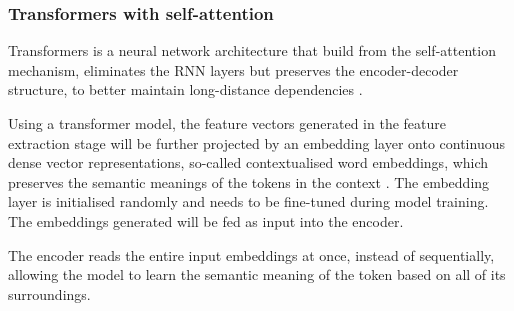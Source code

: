 \subsubsection{Transformers with self-attention}
Transformers is a neural network architecture that build from the self-attention mechanism, eliminates the RNN layers but preserves the encoder-decoder structure, to better maintain long-distance dependencies \cite{Kalyan21transformer}. 

Using a transformer model, the feature vectors generated in the feature extraction stage will be further projected by an embedding layer onto continuous dense vector representations, so-called contextualised word embeddings, which preserves the semantic meanings of the tokens in the context \cite{Almeida19wordembedding}. The embedding layer is initialised randomly and needs to be fine-tuned during model training. The embeddings generated will be fed as input into the encoder.

The encoder reads the entire input embeddings at once, instead of sequentially, allowing the model to learn the semantic meaning of the token based on all of its surroundings.
